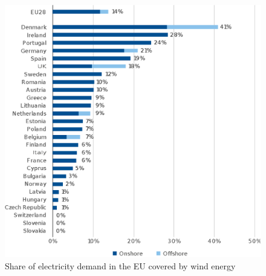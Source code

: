 \begin{figure}[htb]
	\caption{Share of electricity demand in the EU covered by wind energy}
	\begin{center}
		\includegraphics[scale=0.5]{Images/EUrank.eps}
	\end{center}
	\label{fig: EUrank}
\end{figure}

